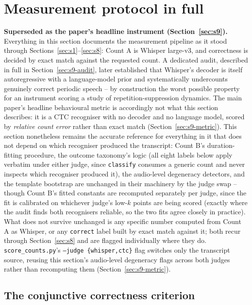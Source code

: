 \documentclass[11pt]{article}
\begin{document}
\section{Measurement protocol in full}
\label{sec:s4}

\noindent\textbf{Superseded as the paper's headline instrument
(Section~\ref{sec:s9}).} Everything in this section documents the
measurement pipeline as it stood through Sections~\ref{sec:s1}--\ref{sec:s8}:
Count A is Whisper large-v3, and correctness is decided by exact match
against the requested count. A dedicated audit, described in full in
Section~\ref{sec:s9-audit}, later established that Whisper's decoder is
itself autoregressive with a language-model prior and systematically
undercounts genuinely correct periodic speech -- by construction the worst
possible property for an instrument scoring a study of
repetition-suppression dynamics. The main paper's headline behavioural
metric is accordingly not what this section describes: it is a CTC
recogniser with no decoder and no language model, scored by \emph{relative
count error} rather than exact match (Section~\ref{sec:s9-metric}). This
section nonetheless remains the accurate reference for everything in it that
does not depend on which recogniser produced the transcript: Count B's
duration-fitting procedure, the outcome taxonomy's logic (all eight labels
below apply verbatim under either judge, since \texttt{classify} consumes a
generic count and never inspects which recogniser produced it), the
audio-level degeneracy detectors, and the template bootstrap are unchanged in
their machinery by the judge swap -- though Count B's fitted constants are
recomputed separately per judge, since the fit is calibrated on whichever
judge's low-$k$ points are being scored (exactly where the audit finds both
recognisers reliable, so the two fits agree closely in practice). What does
not survive unchanged is any specific number computed from Count A as
Whisper, or any \texttt{correct} label built by exact match against it; both
recur through Section~\ref{sec:s8} and are flagged individually where they
do. \texttt{score\_counts.py}'s \texttt{--judge \{whisper,ctc\}} flag
switches only the transcript source, reusing this section's audio-level
degeneracy flags across both judges rather than recomputing them
(Section~\ref{sec:s9-metric}).

\subsection{The conjunctive correctness criterion}
\end{document}
